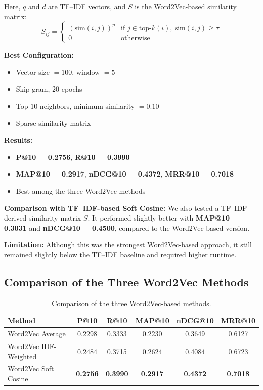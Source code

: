 \documentclass[runningheads]{llncs}
\begin{document}
Here, $q$ and $d$ are TF--IDF vectors, and $S$ is the Word2Vec-based similarity matrix:
\begin{equation}
S_{ij} =
\begin{cases}
(\text{sim}(i,j))^p & \text{if } j \in \text{top-}k(i),\ \text{sim}(i,j) \ge \tau \\
0 & \text{otherwise}
\end{cases}
\end{equation}

\textbf{Best Configuration:}
\begin{itemize}[noitemsep]
    \item Vector size $=100$, window $=5$
    \item Skip-gram, $20$ epochs
    \item Top-$10$ neighbors, minimum similarity $=0.10$
    \item Sparse similarity matrix
\end{itemize}

\textbf{Results:}
\begin{itemize}[noitemsep]
    \item \textbf{P@10 = 0.2756}, \textbf{R@10 = 0.3990}
    \item \textbf{MAP@10 = 0.2917}, \textbf{nDCG@10 = 0.4372}, \textbf{MRR@10 = 0.7018}
    \item Best among the three Word2Vec methods
\end{itemize}

\textbf{Comparison with TF--IDF-based Soft Cosine:}  
We also tested a TF--IDF-derived similarity matrix $S$. It performed slightly better with \textbf{MAP@10 = 0.3031} and \textbf{nDCG@10 = 0.4500}, compared to the Word2Vec-based version.

\textbf{Limitation:}  
Although this was the strongest Word2Vec-based approach, it still remained slightly below the TF--IDF baseline and required higher runtime.

\subsection*{Comparison of the Three Word2Vec Methods}

\begin{table}[h]
\centering
\begin{tabular}{lccccc}
\toprule
\textbf{Method} & \textbf{P@10} & \textbf{R@10} & \textbf{MAP@10} & \textbf{nDCG@10} & \textbf{MRR@10} \\
\midrule
Word2Vec Average & 0.2298 & 0.3333 & 0.2230 & 0.3649 & 0.6127 \\
Word2Vec IDF-Weighted & 0.2484 & 0.3715 & 0.2624 & 0.4084 & 0.6723 \\
Word2Vec Soft Cosine & \textbf{0.2756} & \textbf{0.3990} & \textbf{0.2917} & \textbf{0.4372} & \textbf{0.7018} \\
\bottomrule
\end{tabular}
\caption{Comparison of the three Word2Vec-based methods.}
\label{tab:word2vec_methods}
\end{table}
\end{document}
